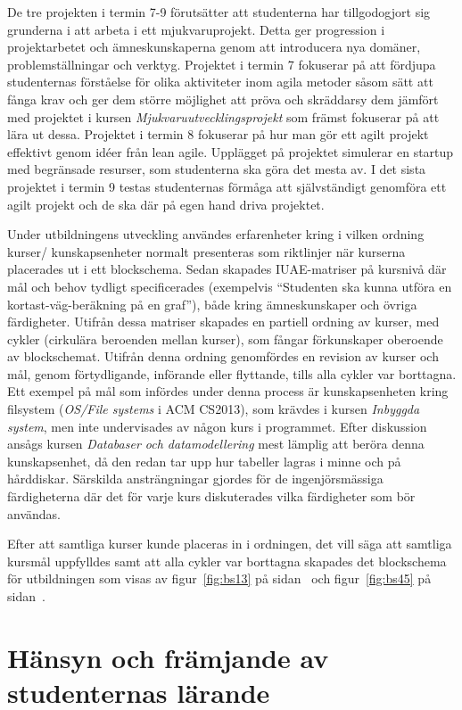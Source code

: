 De tre projekten i termin 7-9 förutsätter att studenterna har tillgodogjort sig grunderna i att arbeta i ett mjukvaruprojekt. Detta ger progression i projektarbetet och ämneskunskaperna genom att introducera nya domäner, problemställningar och verktyg. Projektet i termin 7 fokuserar på att fördjupa studenternas förståelse för olika aktiviteter inom agila metoder såsom sätt att fånga krav och ger dem större möjlighet att pröva och skräddarsy dem jämfört med projektet i kursen \emph{Mjukvaruutvecklingsprojekt} som främst fokuserar på att lära ut dessa. Projektet i termin 8 fokuserar på hur man gör ett agilt projekt effektivt genom idéer från lean agile. Upplägget på projektet simulerar en startup med begränsade resurser, som studenterna ska göra det mesta av. I det sista projektet i termin 9 testas studenternas förmåga att självständigt genomföra ett agilt projekt och de ska där på egen hand driva projektet.

Under utbildningens utveckling användes erfarenheter kring i vilken ordning kurser/ kunskapsenheter normalt presenteras som riktlinjer när kurserna placerades ut i ett blockschema. Sedan skapades IUAE-matriser på kursnivå där mål och behov tydligt specificerades (exempelvis ``Studenten ska kunna utföra en kortast-väg-beräkning på en graf''), både kring ämneskunskaper och övriga färdigheter. Utifrån dessa matriser skapades en partiell ordning av kurser, med cykler (cirkulära beroenden mellan kurser), som fångar förkunskaper oberoende av blockschemat. Utifrån denna ordning genomfördes en revision av kurser och mål, genom förtydligande, införande eller flyttande, tills alla cykler var borttagna. Ett exempel på mål som infördes under denna process är kunskapsenheten kring filsystem (\emph{OS/File systems} i ACM CS2013), som krävdes i kursen \emph{Inbyggda system}, men inte undervisades av någon kurs i programmet. Efter diskussion ansågs kursen \emph{Databaser och datamodellering} mest lämplig att beröra denna kunskapsenhet, då den redan tar upp hur tabeller lagras i minne och på hårddiskar. Särskilda ansträngningar gjordes för de ingenjörsmässiga färdigheterna där det för varje kurs diskuterades vilka färdigheter som bör användas.

Efter att samtliga kurser kunde placeras in i ordningen, det vill säga att samtliga kursmål uppfylldes samt att alla cykler var borttagna skapades det blockschema för utbildningen som visas av figur~\ref{fig:bs13} på sidan~\pageref{fig:bs13} och figur~\ref{fig:bs45} på sidan~\pageref{fig:bs45}.

\section{Hänsyn och främjande av studenternas lärande}

